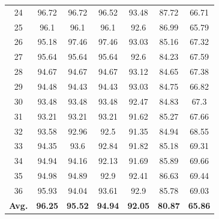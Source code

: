 \documentclass[review]{elsarticle}
\begin{document}
\begin{table}[!t]
{\begin{tabular}{c|cccccc}
		24&96.72&96.72&96.52&93.48&87.72&66.71\\
		25&96.1&96.1&96.1&92.6&86.99&65.79\\
		26&95.18&97.46&97.46&93.03&85.16&67.32\\
		27&95.64&95.64&95.64&92.6&84.23&67.59\\
		28&94.67&94.67&94.67&93.12&84.65&67.38\\
		29&94.48&94.43&94.43&93.03&84.75&66.82\\
		30&93.48&93.48&93.48&92.47&84.83&67.3\\
		31&93.21&93.21&93.21&91.62&85.27&67.66\\
		32&93.58&92.96&92.5&91.35&84.94&68.55\\
		33&94.35&93.6&92.84&91.82&85.18&69.31\\
		34&94.94&94.16&92.13&91.69&85.89&69.66\\
		35&94.98&94.89&92.9&92.41&86.63&69.44\\
		36&95.93&94.04&93.61&92.9&85.78&69.03\\
		\hline
		\textbf{Avg.}&\textbf{96.25}&\textbf{95.52}&\textbf{94.94}&\textbf{92.05}&\textbf{80.87}&\textbf{65.86}\\
		\hline\hline	
	\end{tabular}}
\end{table}



\end{document}
